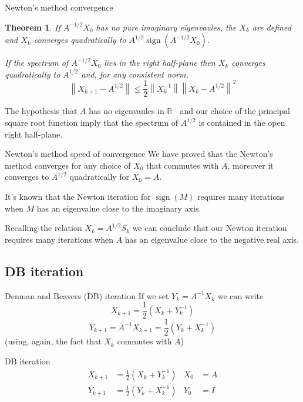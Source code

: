 \documentclass{beamer}
\newcounter{counter1}
\theoremstyle{plain}
\newtheorem{myteo}[counter1]{Theorem}
\theoremstyle{definition}
\theoremstyle{remark}
\newcommand{\pa}[1]{\left(#1\right)}
\newcommand{\norm}[1]{\left\|#1\right\|}
\DeclareMathOperator{\sign}{sign}
\begin{document}
\begin{frame}{Newton's method convergence}
  \begin{myteo}
    If $A^{-1/2}X_0$ has no pure imaginary eigenvaules, the $X_k$
    are defined and $X_k$ converges quadratically to
    $A^{1/2}\sign\pa{A^{-1/2} X_0}$.

    If the spectrum  of $A^{-1/2} X_0$ lies in the right half-plane
    then $X_k$ converges quadratically to $A^{1/2}$ and, for any
    consistent norm,
    \[ \norm{X_{k+1} - A^{1/2}} \le \frac{1}{2}\norm{X_k ^{-1}}
      \norm{X_k - A^{1/2}} ^2 \]
  \end{myteo}
  \vfill
  
  The hypothesis that $A$ has no eigenvaules in $\mathbb{R}^-$ and our
  choice of the principal square root function imply that the spectrum
  of $A^{1/2}$ is contained in the open right half-plane.
\end{frame}

\begin{frame}{Newton's method speed of convergence}
  We have proved that the Newton's method converges for any choice of
  $X_0$ that commutes with $A$, moreover it converges to $A^{1/2}$
  quadratically for $X_0 = A$.
  \vfill
  
  It's known that the Newton iteration for $\sign\pa{M}$ requires many
  iterations when $M$ has an eigenvalue close to the imaginary axis.

  Recalling the relation $X_k = A^{1/2} S_k$ we can conclude that our
  Newton iteration requires many iterations when $A$ has an eigenvalue
  close to the negative real axis.  
\end{frame}

\subsection{DB iteration}

\begin{frame}{Denman and Beavers (DB) iteration}
  If we set $Y_k = A^{-1} X_k$ we can write
  \[ X_{k+1} = \frac{1}{2}\pa{X_k + Y_k ^{-1}} \]
  \[ Y_{k+1} = A^{-1} X_{k+1} = \frac{1}{2}\pa{ Y_k + X_k^{-1}} \]
  (using, again, the fact that $X_k$ commutes with $A$)

  \begin{block}{DB iteration}
    \begin{align*}
      X_{k+1} &= \frac{1}{2} \pa{ X_k + Y_k ^{-1}} & X_0 &= A \\
      Y_{k+1} &= \frac{1}{2} \pa{ Y_k + X_k ^{-1}} & Y_0 &= I 
    \end{align*}
  \end{block}
\end{frame}
\end{document}
